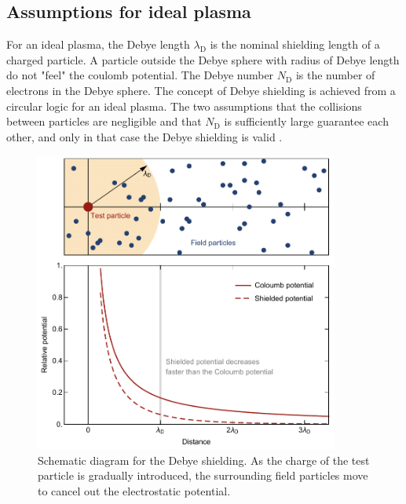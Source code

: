 \subsection{Assumptions for ideal plasma}
\label{sec:ch3-1-1}

For an ideal plasma, the Debye length $\lambda_\text{D}$ is the nominal shielding length of a charged particle. A particle outside the Debye sphere with radius of Debye length do not "feel" the coulomb potential. The Debye number $N_\text{D}$ is the number of electrons in the Debye sphere. The concept of Debye shielding is achieved from a circular logic for an ideal plasma. The two assumptions that the collisions between particles are negligible and that $N_\text{D}$ is sufficiently large guarantee each other, and only in that case the Debye shielding is valid \cite{bellan2008fundamentals}.

\begin{figure}[ht!]
\centering
\includegraphics[width=100mm]{figures/ch3/Debye/shielding.pdf}
\caption{Schematic diagram for the Debye shielding. As the charge of the test particle is gradually introduced, the surrounding field particles move to cancel out the electrostatic potential.}
\label{fig:DebyeShielding}
\end{figure}

